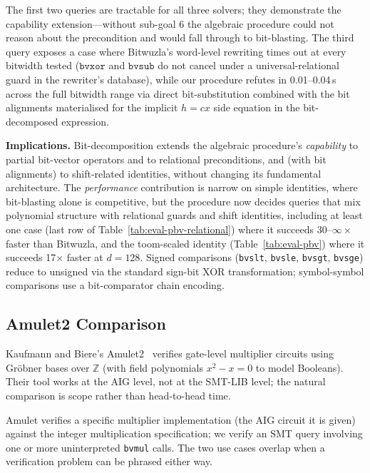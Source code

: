 \documentclass[runningheads]{llncs}
\begin{document}
The first two queries are tractable for all three solvers; they
demonstrate the capability extension---without sub-goal 6 the
algebraic procedure could not reason about the precondition and
would fall through to bit-blasting. The third query exposes a
case where Bitwuzla's word-level rewriting times out at every
bitwidth tested ($\mathtt{bvxor}$ and $\mathtt{bvsub}$ do not
cancel under a universal-relational guard in the rewriter's
database), while our procedure refutes in 0.01--0.04\,s across
the full bitwidth range via direct bit-substitution combined with
the bit alignments materialised for the implicit $h = c x$ side
equation in the bit-decomposed expression.

\textbf{Implications.} Bit-decomposition extends the algebraic
procedure's \emph{capability} to partial bit-vector operators
and to relational preconditions, and (with bit alignments) to
shift-related identities, without changing its fundamental
architecture. The \emph{performance} contribution is narrow on
simple identities, where bit-blasting alone is competitive, but
the procedure now decides queries that mix polynomial structure
with relational guards and shift identities, including at least
one case (last row of Table~\ref{tab:eval-pbv-relational}) where
it succeeds 30--$\infty\times$ faster than Bitwuzla, and the
toom-scaled identity (Table~\ref{tab:eval-pbv}) where it
succeeds 17$\times$ faster at $d{=}128$. Signed comparisons
(\verb|bvslt|, \verb|bvsle|, \verb|bvsgt|, \verb|bvsge|) reduce
to unsigned via the standard sign-bit XOR transformation;
symbol-symbol comparisons use a bit-comparator chain encoding.

\subsection{Amulet2 Comparison}
\label{sec:eval-amulet}

Kaufmann and Biere's Amulet2~\cite{kaufmann2021amulet} verifies
gate-level multiplier circuits using Gr\"obner bases over
$\mathbb{Z}$ (with field polynomials $x^2 - x = 0$ to model
Booleans). Their tool works at the AIG level, not at the
SMT-LIB level; the natural comparison is scope rather than
head-to-head time.

Amulet verifies a specific multiplier implementation (the AIG
circuit it is given) against the integer multiplication
specification; we verify an SMT query involving one or more
uninterpreted \texttt{bvmul} calls. The two use cases overlap when
a verification problem can be phrased either way.
\end{document}
